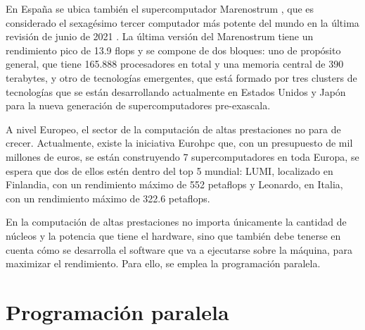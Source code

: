 En España se ubica también el supercomputador Marenostrum \cite{marenostrum}, que es considerado el sexagésimo tercer computador más potente del mundo en la última revisión de junio de 2021 \cite{marenostrumtop}. La última versión del Marenostrum tiene un rendimiento pico de 13.9 flops y se compone de dos bloques: uno de propósito general, que tiene 165.888 procesadores en total y una memoria central de 390 terabytes, y otro de tecnologías emergentes, que está formado por tres clusters de tecnologías que se están desarrollando actualmente en Estados Unidos y Japón para la nueva generación de supercomputadores pre-exascala.

\vspace{2mm}

A nivel Europeo, el sector de la computación de altas prestaciones no para de crecer. Actualmente, existe la iniciativa Eurohpc \cite{eurohpc} que, con un presupuesto de mil millones de euros, se están construyendo 7 supercomputadores en toda Europa,  se espera que dos de ellos estén dentro del top 5 mundial: LUMI, localizado en Finlandia, con un rendimiento máximo de 552 petaflops y Leonardo, en Italia, con un rendimiento máximo de 322.6 petaflops.


\vspace{4mm}
En la computación de altas prestaciones no importa únicamente la cantidad de núcleos y la potencia que tiene el hardware, sino que también debe tenerse en cuenta cómo se desarrolla el software que va a ejecutarse sobre la máquina, para maximizar el rendimiento. Para ello, se emplea la programación paralela.

\section{Programación paralela}

